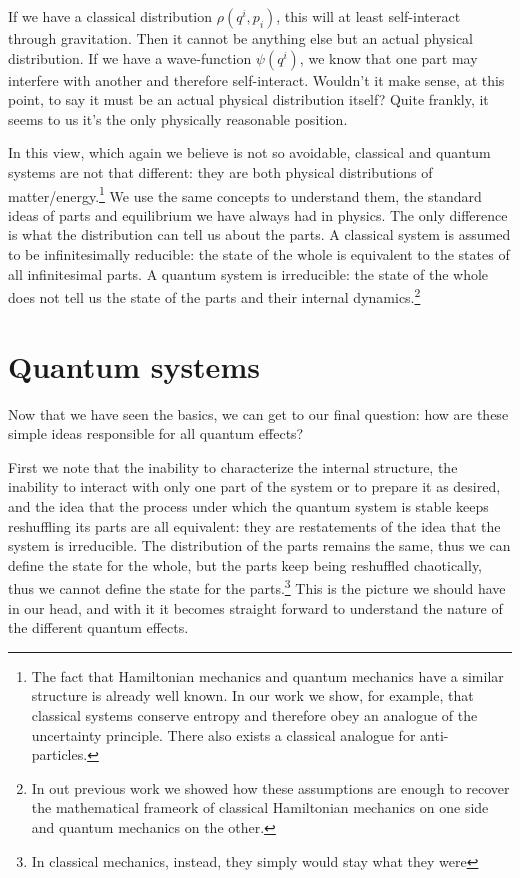 \documentclass[letterpaper]{article}
\theoremstyle{plain}%
\theoremstyle{definition}
\theoremstyle{remark}
\begin{document}
If we have a classical distribution $\rho(q^i,p_i)$, this will at least self-interact through gravitation. Then it cannot be anything else but an actual physical distribution. If we have a wave-function $\psi(q^i)$, we know that one part may interfere with another and therefore self-interact. Wouldn't it make sense, at this point, to say it must be an actual physical distribution itself? Quite frankly, it seems to us it's the only physically reasonable position.

In this view, which again we believe is not so avoidable, classical and quantum systems are not that different: they are both physical distributions of matter/energy.\footnote{The fact that Hamiltonian mechanics and quantum mechanics have a similar structure is already well known. In our work we show, for example, that classical systems conserve entropy and therefore obey an analogue of the uncertainty principle. There also exists a classical analogue for anti-particles.} We use the same concepts to understand them, the standard ideas of parts and equilibrium we have always had in physics. The only difference is what the distribution can tell us about the parts. A classical system is assumed to be infinitesimally reducible: the state of the whole is equivalent to the states of all infinitesimal parts. A quantum system is irreducible: the state of the whole does not tell us the state of the parts and their internal dynamics.\footnote{In out previous work we showed how these assumptions are enough to recover the mathematical frameork of classical Hamiltonian mechanics on one side and quantum mechanics on the other.}

\section{Quantum systems}

Now that we have seen the basics, we can get to our final question: how are these simple ideas responsible for all quantum effects?

First we note that the inability to characterize the internal structure, the inability to interact with only one part of the system or to prepare it as desired, and the idea that the process under which the quantum system is stable keeps reshuffling its parts are all equivalent: they are restatements of the idea that the system is irreducible. The distribution of the parts remains the same, thus we can define the state for the whole, but the parts keep being reshuffled chaotically, thus we cannot define the state for the parts.\footnote{In classical mechanics, instead, they simply would stay what they were} This is the picture we should have in our head, and with it it becomes straight forward to understand the nature of the different quantum effects.
\end{document}
